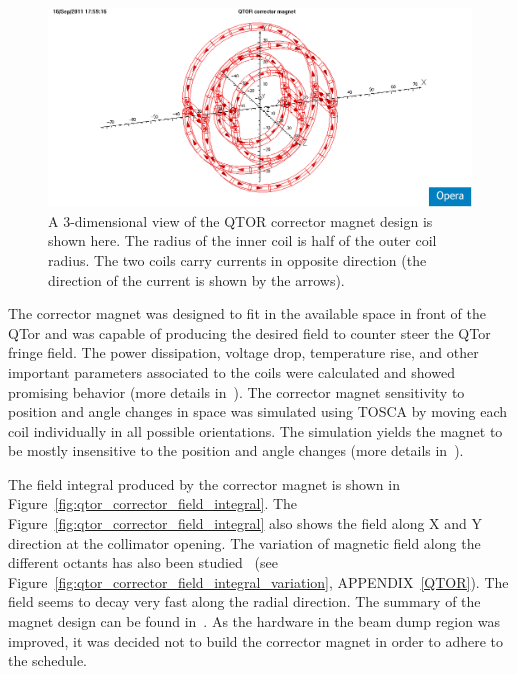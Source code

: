 \begin{figure}[!h]
	\begin{center}
		\includegraphics[width=15.0cm]{figures/qtor_corrector_vector}
	\end{center}
		\caption
		{A 3-dimensional view of the QTOR corrector magnet design is shown here. The radius of the inner coil is half of the outer coil radius. The two coils carry currents in opposite direction (the direction of the current is shown by the arrows).}
		\label{fig:qtor_corrector_vector}
\end{figure}

The corrector magnet was designed to fit in the available space in front of the QTor and was capable of producing the desired field to counter steer the QTor fringe field. The power dissipation, voltage drop, temperature rise, and other important parameters associated to the coils were calculated and showed promising behavior (more details in~\cite{elog:nur_qtor9}). The corrector magnet sensitivity to position and angle changes in space was simulated using TOSCA by moving each coil individually in all possible orientations. The simulation yields the magnet to be mostly insensitive to the position and angle changes (more details in~\cite{elog:nur_qtor10}). 

The field integral produced by the corrector magnet is shown in Figure~\ref{fig:qtor_corrector_field_integral}. The Figure~\ref{fig:qtor_corrector_field_integral} also shows the field along X and Y direction at the collimator opening. The variation of magnetic field along the different octants has also been studied~\cite{elog:nur_qtor11} (see Figure~\ref{fig:qtor_corrector_field_integral_variation}, APPENDIX~\ref{QTOR}). The field seems to decay very fast along the radial direction. The summary of the magnet design can be found in~\cite{elog:nur_qtor12}. %
As the hardware in the beam dump region was improved, it was decided not to build the corrector magnet in order to adhere to the schedule.

